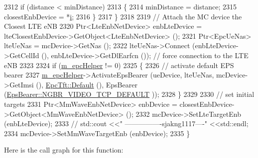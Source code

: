 \begin{DoxyCode}
2312             \textcolor{keywordflow}{if} (distance < minDistance)
2313             \{
2314                 minDistance = distance;
2315                 closestEnbDevice = *\hyperlink{bernuolliDistribution_8m_a6f6ccfcf58b31cb6412107d9d5281426}{i};
2316             \}
2317         \}
2318         
2319         \textcolor{comment}{// Attach the MC device the Closest LTE eNB}
2320         Ptr<LteEnbNetDevice> enbLteDevice = lteClosestEnbDevice->GetObject<LteEnbNetDevice> ();
2321         Ptr<EpcUeNas> lteUeNas = mcDevice->GetNas ();
2322         lteUeNas->Connect (enbLteDevice->GetCellId (), enbLteDevice->GetDlEarfcn ()); \textcolor{comment}{// force connection
       to the LTE eNB}
2323 
2324         \textcolor{keywordflow}{if} (\hyperlink{classns3_1_1MmWaveHelper_a03b33f9a2480a4cdd8ffe697ccc08e9e}{m\_epcHelper} != 0)
2325         \{
2326           \textcolor{comment}{// activate default EPS bearer}
2327           \hyperlink{classns3_1_1MmWaveHelper_a03b33f9a2480a4cdd8ffe697ccc08e9e}{m\_epcHelper}->ActivateEpsBearer (ueDevice, lteUeNas, mcDevice->GetImsi (), 
      \hyperlink{classns3_1_1EpcTft_a48c099da249ba99152c2e597c864e155}{EpcTft::Default} (), EpsBearer (\hyperlink{structns3_1_1EpsBearer_aecf0c67109c5eb4ec0b07226fff5885ea0e7232f1a6148d754be3a3d9e425d452}{EpsBearer::NGBR\_VIDEO\_TCP\_DEFAULT}
      ));
2328         \}
2329 
2330         \textcolor{comment}{// set initial targets}
2331         Ptr<MmWaveEnbNetDevice> enbDevice = closestEnbDevice->GetObject<MmWaveEnbNetDevice> ();
2332         mcDevice->SetLteTargetEnb (enbLteDevice);
2333  \textcolor{comment}{//     std::cout <<" ----------------sjakng1117----" <<std::endl;}
2334         mcDevice->SetMmWaveTargetEnb (enbDevice);
2335 \}
\end{DoxyCode}


Here is the call graph for this function\+:


